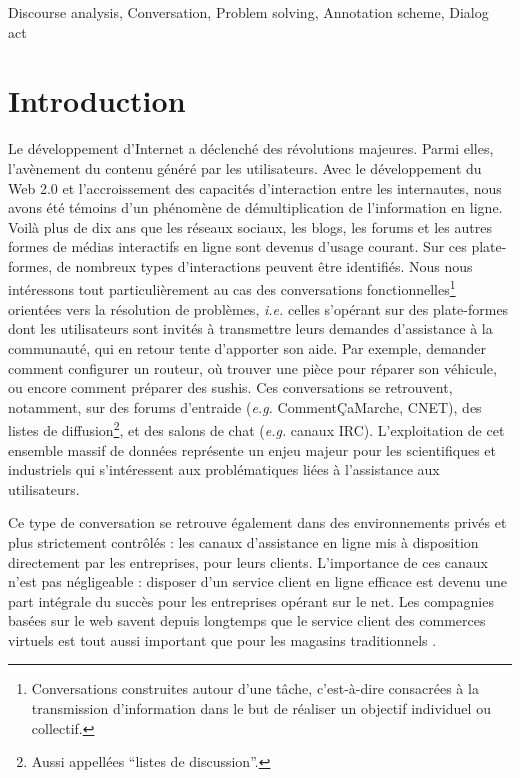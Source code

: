 \documentclass[10pt,a4paper,twoside]{article}
\newcommand{\quotes}[1]{``#1''}
\begin{document}
{Discourse analysis, Conversation, Problem solving, Annotation scheme, Dialog act}


\section{Introduction}
\label{sec:introduction}

Le développement d'Internet a déclenché des révolutions majeures. Parmi elles, l'avènement du contenu généré par les utilisateurs. Avec le développement du Web 2.0 et l'accroissement des capacités d'interaction entre les internautes, nous avons été témoins d'un phénomène de démultiplication de l'information en ligne. Voilà plus de dix ans que les réseaux sociaux, les blogs, les forums et les autres formes de médias interactifs en ligne sont devenus d'usage courant. Sur ces plate-formes, de nombreux types d'interactions peuvent être identifiés. Nous nous intéressons tout particulièrement au cas des conversations fonctionnelles\footnote{Conversations construites autour d'une tâche, c'est-à-dire consacrées à la transmission d'information dans le but de réaliser un objectif individuel ou collectif.} orientées vers la résolution de problèmes, \textit{i.e.} celles s'opérant sur des plate-formes dont les utilisateurs sont invités à transmettre leurs demandes d'assistance à la communauté, qui en retour tente d'apporter son aide. Par exemple, demander comment configurer un routeur, où trouver une pièce pour réparer son véhicule, ou encore comment préparer des sushis. Ces conversations se retrouvent, notamment, sur des forums d'entraide (\textit{e.g.} CommentÇaMarche, CNET), des listes de diffusion\footnote{Aussi appellées \quotes{listes de discussion}.}, et des salons de chat (\textit{e.g.} canaux IRC). L'exploitation de cet ensemble massif de données représente un enjeu majeur pour les scientifiques et industriels qui s'intéressent aux problématiques liées à l'assistance aux utilisateurs.

Ce type de conversation se retrouve également dans des environnements privés et plus strictement contrôlés : les canaux d'assistance en ligne mis à disposition directement par les entreprises, pour leurs clients. L'importance de ces canaux n'est pas négligeable : disposer d'un service client en ligne efficace est devenu une part intégrale du succès pour les entreprises opérant sur le net. Les compagnies basées sur le web savent depuis longtemps que le service client des commerces virtuels est tout aussi important que pour les magasins traditionnels \cite{bernett2000e}.
\end{document}
